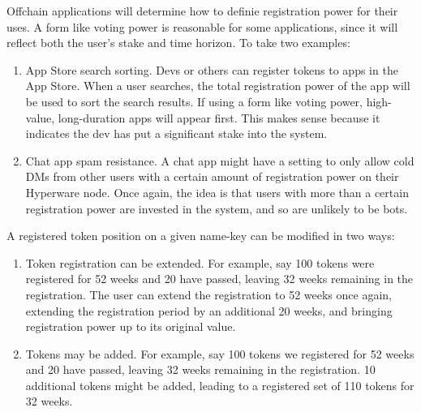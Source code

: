 \documentclass{article}
\begin{document}
Offchain applications will determine how to definie registration power for their uses.
A form like voting power is reasonable for some applications, since it will reflect both the user's stake and time horizon.
To take two examples:
\begin{enumerate}
	\item App Store search sorting.
		Devs or others can register tokens to apps in the App Store.
		When a user searches, the total registration power of the app will be used to sort the search results.
		If using a form like voting power, high-value, long-duration apps will appear first.
		This makes sense because it indicates the dev has put a significant stake into the system.
	\item Chat app spam resistance.
		A chat app might have a setting to only allow cold DMs from other users with a certain amount of registration power on their Hyperware node.
		Once again, the idea is that users with more than a certain registration power are invested in the system, and so are unlikely to be bots.
\end{enumerate}

A registered token position on a given name-key can be modified in two ways:
\begin{enumerate}
    \item Token registration can be extended.
       For example, say 100 tokens were registered for 52 weeks and 20 have passed, leaving 32 weeks remaining in the registration.
       The user can extend the registration to 52 weeks once again, extending the registration period by an additional 20 weeks, and bringing registration power up to its original value.
    \item Tokens may be added.
       For example, say 100 tokens we registered for 52 weeks and 20 have passed, leaving 32 weeks remaining in the registration.
       10 additional tokens might be added, leading to a registered set of 110 tokens for 32 weeks.
\end{enumerate}
\end{document}
